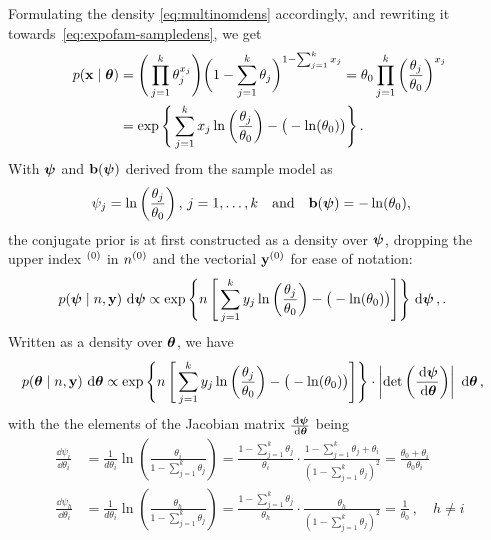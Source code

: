 Formulating the density \eqref{eq:multinomdens} accordingly, and rewriting it towards~\eqref{eq:expofam-sampledens},
we get
\begin{align*}
p(\x\mid\btheta)&= \Bigg( \prod_{j=1}^k \theta_j^{x_j}\Bigg) \bigg( 1 - \sum_{j=1}^k \theta_j\bigg)^{1-\sum_{j=1}^k x_j}%
                 = \theta_0 \prod_{j=1}^k \left(\frac{\theta_j}{\theta_0}\right)^{x_j} \\
                &= \exp\Bigg\{ \sum_{j=1}^k x_j \ln\bigg(\frac{\theta_j}{\theta_0}\bigg) - \big(-\ln(\theta_0)\big) \Bigg\}\,.
\end{align*}
With $\boldsymbol{\psi}$ and $\mathbf{b}(\boldsymbol{\psi})$ derived from the sample model as
\begin{align*}
\psi_j &= \ln\left(\frac{\theta_j}{\theta_0}\right),\, j=1,\ldots,k & \text{and}& &
\mbf{b}(\bpsi) &= -\ln(\theta_0),\,%
\end{align*}
the conjugate prior is at first constructed as a density over $\boldsymbol{\psi}$,
dropping the upper index ${}^{(0)}$ in $n^{(0)}$ and the vectorial $\mathbf{y}^{(0)}$ for ease of notation:
\begin{align*}
p(\boldsymbol{\psi}\mid n,\mathbf{y})\, \,\mathrm{d}\boldsymbol{\psi}
 &\propto \exp\Bigg\{n\, \Bigg[ \sum_{j=1}^k y_j \ln\bigg(\frac{\theta_j}{\theta_0}\bigg) - \big(-\ln(\theta_0)\big) \Bigg] \Bigg\} \,\,\mathrm{d}\boldsymbol{\psi}\,,.
\end{align*}
Written as a density over $\boldsymbol{\theta}$, we have
\begin{align*}
p(\boldsymbol{\theta}\mid n,\mathbf{y})\, \,\mathrm{d}\boldsymbol{\theta}
 &\propto \exp\Bigg\{n\, \Bigg[ \sum_{j=1}^k y_j \ln\bigg(\frac{\theta_j}{\theta_0}\bigg) - \big(-\ln(\theta_0)\big) \Bigg] \Bigg\}
  \cdot \left| \det\left(\frac{\,\mathrm{d}\boldsymbol{\psi}}{\,\mathrm{d}\boldsymbol{\theta}}\right) \right|\, \,\mathrm{d}\boldsymbol{\theta}\,,
\end{align*}
with the the elements of the Jacobian matrix $\frac{\,\mathrm{d}\boldsymbol{\psi}}{\,\mathrm{d}\boldsymbol{\theta}}$ being
\begin{align*}
\frac{\dd\psi_i}{\dd\theta_i} &= \frac{1}{d\theta_i} \ln\left(\frac{\theta_i}{1 - \sum_{j=1}^k \theta_j}\right)
                               = \frac{1-\sum_{j=1}^k \theta_j}{\theta_i}
                                 \cdot \frac{1 - \sum_{j=1}^k \theta_j + \theta_i}{(1 - \sum_{j=1}^k \theta_j)^2}
                               = \frac{\theta_0 + \theta_i}{\theta_0 \theta_i}\\
\frac{\dd\psi_h}{\dd\theta_i} &= \frac{1}{d\theta_i} \ln\left(\frac{\theta_h}{1 - \sum_{j=1}^k \theta_j}\right)
                               = \frac{1-\sum_{j=1}^k \theta_j}{\theta_h} \cdot \frac{\theta_h}{(1 - \sum_{j=1}^k \theta_j)^2}
                               = \frac{1}{\theta_0}\,, \quad h \neq i
\end{align*}
